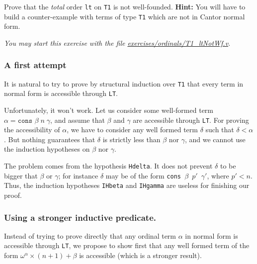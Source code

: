 
\begin{exercise}
Prove that the \emph{total} order \texttt{lt} on \texttt{T1} is not well-founded. 
\textbf{Hint:}  You will have to build a counter-example with terms of type \texttt{T1}
which are not in Cantor normal form.

\emph{You may start this exercise with the file
    \href{https://github.com/coq-community/hydra-battles/tree/master/exercises/ordinals/T1_ltNotWf.v}{exercises/ordinals/T1\_ltNotWf.v}.}
\end{exercise}

\subsubsection{A first attempt}
\label{sec:orgheadline77}

It is natural to try to prove by structural induction over \texttt{T1} 
that every term in normal form is accessible through \texttt{LT}.

Unfortunately, it won't work. Let us consider some well-formed term
 $\alpha=\texttt{cons $\beta\;n\;\gamma$}$, and assume that \(\beta\) and \(\gamma\) are accessible
 through \texttt{LT}. For proving the accessibility of $\alpha$, we have to consider
any well formed term \(\delta\) such that \(\delta<\alpha\). 
But nothing guarantees that \(\delta\)  is strictly  less than \(\beta\) nor \(\gamma\), and we cannot use the induction hypotheses on   \(\beta\) nor \(\gamma\).




The problem comes from the hypothesis \texttt{Hdelta}. It does not prevent  \(\delta\) to be bigger that \(\beta\) or
\(\gamma\);
for instance \(\delta\) may be of the form
\texttt{cons $\beta$ $p'$  $\gamma'$},
where    \(p' < n\).
Thus, the induction hypotheses \texttt{IHbeta} and \texttt{IHgamma}  are useless for finishing our proof.



\subsubsection{Using a stronger inductive predicate.}
\label{sec:orgheadline78}
\label{sec:strongly-accessible}

  Instead of trying to prove directly that any ordinal term \(\alpha\) in normal form is accessible
through \texttt{LT}, we propose to show first that any well formed 
term of the form \(\omega^\alpha\times(n+1)+\beta\) is accessible (which is a stronger result).

